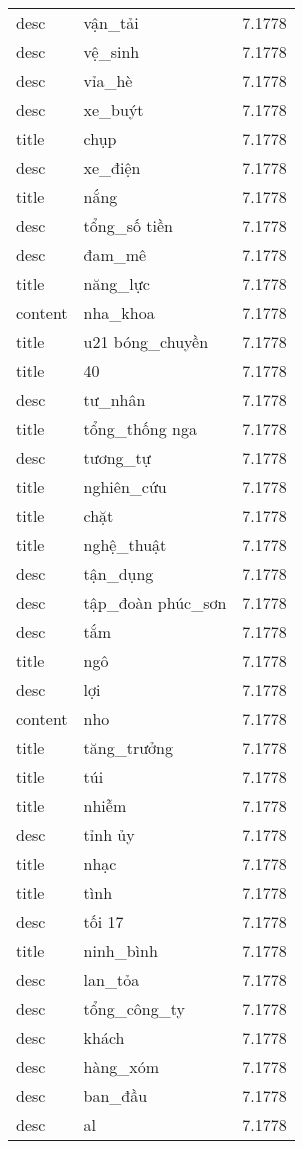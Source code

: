 \documentclass{article}
\begin{document}
\begin{tabular}{lll}
desc & vận\_tải & 7.1778\\
desc & vệ\_sinh & 7.1778\\
desc & vỉa\_hè & 7.1778\\
desc & xe\_buýt & 7.1778\\
title & chụp & 7.1778\\
desc & xe\_điện & 7.1778\\
title & nắng & 7.1778\\
desc & tổng\_số tiền & 7.1778\\
desc & đam\_mê & 7.1778\\
title & năng\_lực & 7.1778\\
content & nha\_khoa & 7.1778\\
title & u21 bóng\_chuyền & 7.1778\\
title & 40 & 7.1778\\
desc & tư\_nhân & 7.1778\\
title & tổng\_thống nga & 7.1778\\
desc & tương\_tự & 7.1778\\
title & nghiên\_cứu & 7.1778\\
title & chặt & 7.1778\\
title & nghệ\_thuật & 7.1778\\
desc & tận\_dụng & 7.1778\\
desc & tập\_đoàn phúc\_sơn & 7.1778\\
desc & tắm & 7.1778\\
title & ngô & 7.1778\\
desc & lợi & 7.1778\\
content & nho & 7.1778\\
title & tăng\_trưởng & 7.1778\\
title & túi & 7.1778\\
title & nhiễm & 7.1778\\
desc & tỉnh ủy & 7.1778\\
title & nhạc & 7.1778\\
title & tình & 7.1778\\
desc & tối 17 & 7.1778\\
title & ninh\_bình & 7.1778\\
desc & lan\_tỏa & 7.1778\\
desc & tổng\_công\_ty & 7.1778\\
desc & khách & 7.1778\\
desc & hàng\_xóm & 7.1778\\
desc & ban\_đầu & 7.1778\\
desc & al & 7.1778\\

\end{tabular}
\end{document}
